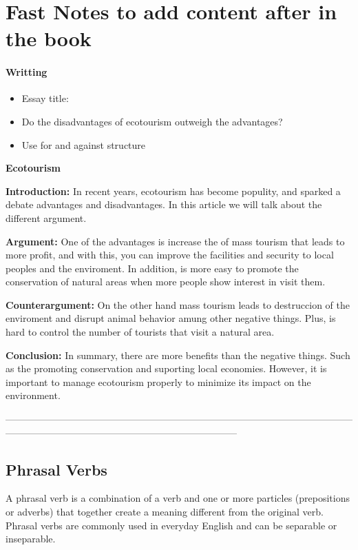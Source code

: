 \chapter{Fast Notes to add content after in the book}


\subsubsection{Writting}

\begin{itemize}
    \item Essay title:
    \item Do the disadvantages of ecotourism outweigh the advantages?
    \item Use for and against structure
\end{itemize}


\textbf{Ecotourism}

\textbf{Introduction:} In recent years, ecotourism has become populity, and sparked a debate  advantages and disadvantages. In this article we will talk about the different argument.

\textbf{Argument:} One of the advantages is increase the of mass tourism that leads to more profit, and with this, you can improve the facilities and security to local peoples and the enviroment. In addition, is more easy to promote the conservation of natural areas when more people show interest in visit them.

\textbf{Counterargument:} On the other hand mass tourism leads to destruccion of the enviroment and disrupt animal behavior amung other negative things. Plus, is hard to control the number of tourists that visit a natural area.

\textbf{Conclusion:} In summary, there are more benefits than the negative things. Such as the promoting conservation and suporting local economies. However, it is important to manage ecotourism properly to minimize its impact on the environment.




------------------------------------------------------------------------------------------------------------------------------------------------------------------------------------


\section{Phrasal Verbs}

A phrasal verb is a combination of a verb and one or more particles (prepositions or adverbs) that together create a meaning different from the original verb. Phrasal verbs are commonly used in everyday English and can be separable or inseparable.


